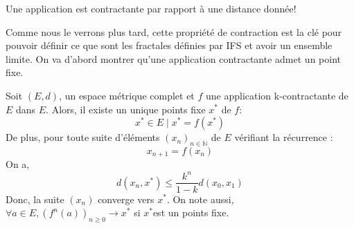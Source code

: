 \documentclass[a4paper, 12pt]{report}
\begin{document}
			\begin{remark*}
				Une application est contractante  par rapport à une distance donnée!
			\end{remark*}

			\hspace{.7 cm}Comme nous le verrons plus tard, cette propriété de contraction est la clé pour pouvoir définir ce que sont les fractales définies par IFS et avoir un ensemble limite. On va d'abord montrer qu'une application contractante admet un point fixe.
			
			\begin{theorem}
				\label{ThmPtFixe}
				Soit $(E,d)$, un espace métrique complet et $f$ une application k-contractante de $E$ dans $E$. Alors, il existe un unique points fixe $x^*$ de $f$:
				\begin{equation*}
					x^*\in E\mid x^*=f(x^*)
				\end{equation*}
				De plus, pour toute suite d'éléments $(x_n)_{n\in\mathds{N}}$ de $E$ vérifiant la récurrence :
				\begin{equation*}
					x_{n+1}=f(x_n)
				\end{equation*}
				On a,
				\begin{equation}
					d(x_n,x^*)\leq \frac{k^n}{1-k} d(x_0,x_1)
				\end{equation}
				Donc, la suite $(x_n)$ converge vers $x^*$.
				On note aussi, $\forall a\in E,(f^n(a))_{n\geq 0}\longrightarrow x^*$ si $x^*$est un points fixe.
			\end{theorem}
\end{document}
